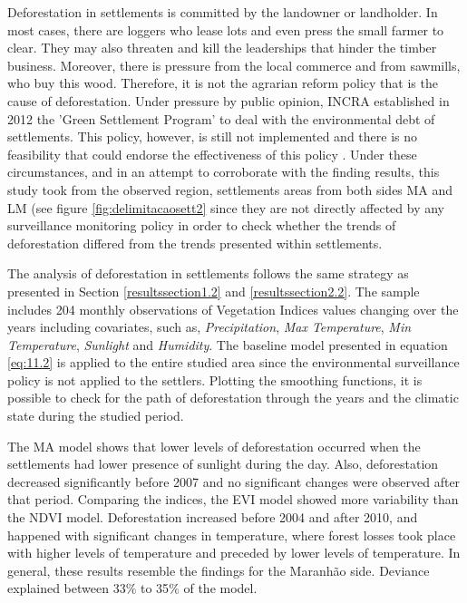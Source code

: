 Deforestation in settlements is committed by the landowner or landholder. In most cases, there are loggers who lease lots and even press the small farmer to clear. They may also threaten and kill the leaderships that hinder the timber business. Moreover, there is pressure from the local commerce and from sawmills, who buy this wood. Therefore, it is not the agrarian reform policy that is the cause of deforestation. Under pressure by public opinion, INCRA established in 2012 the 'Green Settlement Program' to deal with the environmental debt of settlements. This policy, however, is still not implemented and there is no feasibility that could endorse the effectiveness of this policy \citet{PACHECO,PERES2}. Under these circumstances, and in an attempt to corroborate with the finding results, this study took from the observed region, settlements areas from both sides MA and LM (see figure \ref{fig:delimitacaosett2} since they are not directly affected by any surveillance monitoring policy in order to check whether the trends of deforestation differed from the trends presented within settlements.

The analysis of deforestation in settlements follows the same strategy as presented in Section \ref{resultssection1.2} and \ref{resultssection2.2}. The sample includes 204 monthly observations of Vegetation Indices values changing over the years including covariates, such as, \textit{Precipitation}, \textit{Max Temperature}, \textit{Min Temperature}, \textit{Sunlight} and \textit{Humidity}. The baseline model presented in equation \ref{eq:11.2} is applied to the entire studied area since the environmental surveillance policy is not applied to the settlers. Plotting the smoothing functions, it is possible to check for the path of deforestation through the years and the  climatic  state  during  the studied period. 

The MA model shows that lower levels of deforestation occurred when the settlements had lower presence of sunlight during the day. Also, deforestation decreased significantly before 2007 and no significant changes were observed after that period. Comparing the indices, the EVI model showed more variability than the NDVI model. Deforestation increased before 2004 and after 2010, and happened with significant changes in temperature, where forest losses took place with higher levels of temperature and preceded by lower levels of temperature. In general, these results resemble the findings for the Maranhão side. Deviance explained between 33$\%$ to 35$\%$ of the model.

